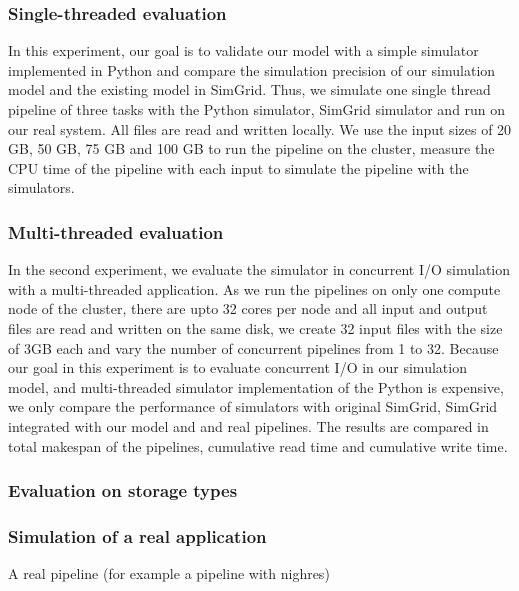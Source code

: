 \documentclass[conference]{IEEEtran}
\begin{document}
			\subsubsection{Single-threaded evaluation}

				In this experiment, our goal is to validate our model with a simple 
				simulator implemented in Python and compare the simulation precision 
				of our simulation model and the existing model in SimGrid. 
				Thus, we simulate one single thread pipeline of three tasks with the
				Python simulator, SimGrid simulator and run on our real system. 
				All files are read and written locally. We use the input sizes of 
				20 GB, 50 GB, 75 GB and 100 GB to run the pipeline on the cluster, 
				measure the CPU time of the pipeline with each input to simulate 
				the pipeline with the simulators.

			\subsubsection{Multi-threaded evaluation}

				In the second experiment, we evaluate the simulator in concurrent I/O 
				simulation with a multi-threaded application. As we run the pipelines on 
				only one compute node of the cluster, there are upto 32 cores per node 
				and all input and output files are read and written on the same disk,  
				we create 32 input files with the size of 3GB each and vary the number of 
				concurrent pipelines from 1 to 32. Because our goal in this experiment is 
				to evaluate concurrent I/O in our simulation model, and multi-threaded 
				simulator implementation of the Python is expensive, we only compare the 
				performance of simulators with original SimGrid, SimGrid integrated with 
				our model and and real pipelines. The results are compared in total 
				makespan of the pipelines, cumulative read time and cumulative write time.
			
			\subsubsection{Evaluation on storage types}

				

			\subsubsection{Simulation of a real application}
				A real pipeline (for example a pipeline with nighres)
\end{document}
